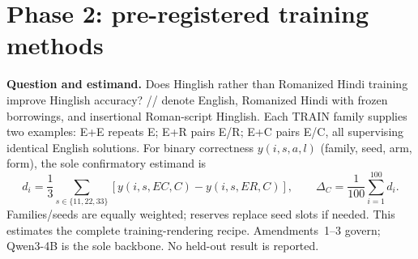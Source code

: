
\section{Phase 2: pre-registered training methods}
\label{sec:phase2-methods-draft}

\noindent\textbf{Question and estimand.} Does Hinglish rather than Romanized Hindi training improve Hinglish accuracy? // denote English, Romanized Hindi with frozen borrowings, and insertional Roman-script Hinglish. Each TRAIN family supplies two examples: E+E repeats E; E+R pairs E/R; E+C pairs E/C, all supervising identical English solutions. For binary correctness $y(i,s,a,l)$ (family, seed, arm, form), the sole confirmatory estimand is
\[
 d_i=\frac{1}{3}\sum_{s\in\{11,22,33\}}
 [y(i,s,EC,C)-y(i,s,ER,C)],\qquad
 \Delta_C=\frac{1}{100}\sum_{i=1}^{100}d_i .
\]
Families/seeds are equally weighted; reserves replace seed slots if needed. This estimates the complete training-rendering recipe. Amendments~1--3 govern; Qwen3-4B is the sole backbone. No held-out result is reported.

